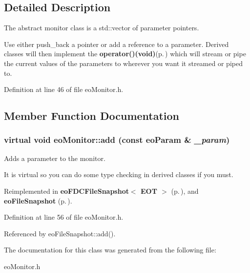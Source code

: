 \subsection{Detailed Description}
The abstract monitor class is a std::vector of parameter pointers. 

Use either push\_\-back a pointer or add a reference to a parameter. Derived classes will then implement the {\bf operator()(void)}{\rm (p.\,\pageref{classeo_f_a1})} which will stream or pipe the current values of the parameters to wherever you want it streamed or piped to. 



Definition at line 46 of file eo\-Monitor.h.

\subsection{Member Function Documentation}
\subsubsection{\setlength{\rightskip}{0pt plus 5cm}virtual void eo\-Monitor::add (const {\bf eo\-Param} \& {\em \_\-param})\hspace{0.3cm}{\tt  [inline, virtual]}}\label{classeo_monitor_a1}


Adds a parameter to the monitor. 

It is virtual so you can do some type checking in derived classes if you must. 

Reimplemented in {\bf eo\-FDCFile\-Snapshot$<$ EOT $>$} {\rm (p.\,\pageref{classeo_f_d_c_file_snapshot_a1})}, and {\bf eo\-File\-Snapshot} {\rm (p.\,\pageref{classeo_file_snapshot_a9})}.

Definition at line 56 of file eo\-Monitor.h.

Referenced by eo\-File\-Snapshot::add().

The documentation for this class was generated from the following file:\begin{CompactItemize}
\item 
eo\-Monitor.h\end{CompactItemize}
